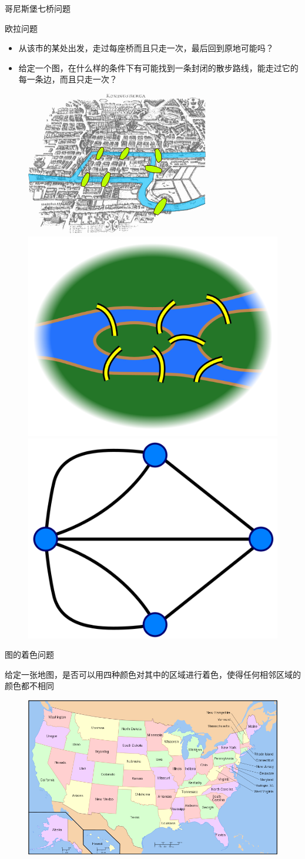 \documentclass[UTF8]{ctexbeamer}
\begin{document}
\begin{frame}{哥尼斯堡七桥问题}

  \begin{block}{欧拉问题}
    \begin{itemize}
    \item 从该市的某处出发，走过每座桥而且只走一次，最后回到原地可能吗？
    \item 给定一个图，在什么样的条件下有可能找到一条封闭的散步路线，能走过它的每一条边，而且只走一次？
    \end{itemize}
  \end{block}

  \begin{figure}
    \centering
    \includegraphics[width=.3\textwidth{}]{Konigsberg_bridges.png}
    \includegraphics[width=.3\textwidth{}]{600px-7_bridges.svg.png}
    \includegraphics[width=.3\textwidth{}]{500px-Konigsburg_graph.svg.png}
  \end{figure}
  
\end{frame}

\begin{frame}{图的着色问题}
  \begin{block}{}
    给定一张地图，是否可以用四种颜色对其中的区域进行着色，使得任何相邻区域的颜色都不相同
  \end{block}

  \begin{figure}
    \centering
    \includegraphics[width=.6\textwidth{}]{Map_of_USA_with_state_names.svg.png}
  \end{figure}
  
\end{frame}
\end{document}
